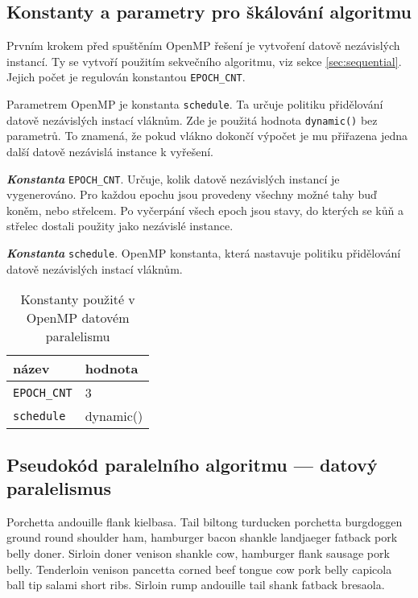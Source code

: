 \documentclass{article}
\newcommand{\const}[1]{\texttt{#1}}
\newcommand{\konstanta}[1]{\textbf{\textit{Konstanta}} \const{#1}.}
\begin{document}
    \subsection{Konstanty a parametry pro škálování algoritmu}
    Prvním krokem před spuštěním OpenMP řešení je vytvoření datově nezávislých instancí.
    Ty se vytvoří použitím sekvečního algoritmu, viz sekce \ref{sec:sequential}.
    Jejich počet je regulován konstantou \const{EPOCH_CNT}.

    Parametrem OpenMP je konstanta \const{schedule}. Ta určuje politiku přidělování datově nezávislých instací vláknům.
    Zde je použitá hodnota \const{dynamic()} bez parametrů. To znamená, že pokud vlákno dokončí výpočet je mu
    přiřazena jedna další datově nezávislá instance k vyřešení.

    \konstanta{EPOCH_CNT} Určuje, kolik datově nezávislých instancí je vygenerováno.
    Pro každou epochu jsou provedeny všechny možné tahy buď koněm, nebo střelcem.
    Po vyčerpání všech epoch jsou stavy, do kterých se kůň a střelec dostali
    použity jako nezávislé instance.

    \konstanta{schedule} OpenMP konstanta, která nastavuje politiku přidělování datově nezávislých instací vláknům.

    \begin{table}[hb]
        \centering
        \begin{tabular}{|l|l|}
            \hline
            název      & hodnota \\ \hline
            \const{EPOCH_CNT} & 3       \\ \hline
            \const{schedule} & dynamic()      \\ \hline
        \end{tabular}
        \caption{Konstanty použité v OpenMP datovém paralelismu}
        \label{tab:data-par-constants}
    \end{table}

    \subsection{Pseudokód paralelního algoritmu — datový paralelismus}
    Porchetta andouille flank kielbasa. Tail biltong turducken porchetta burgdoggen ground round shoulder ham, hamburger bacon shankle landjaeger fatback pork belly doner. Sirloin doner venison shankle cow, hamburger flank sausage pork belly. Tenderloin venison pancetta corned beef tongue cow pork belly capicola ball tip salami short ribs. Sirloin rump andouille tail shank fatback bresaola.
\end{document}
